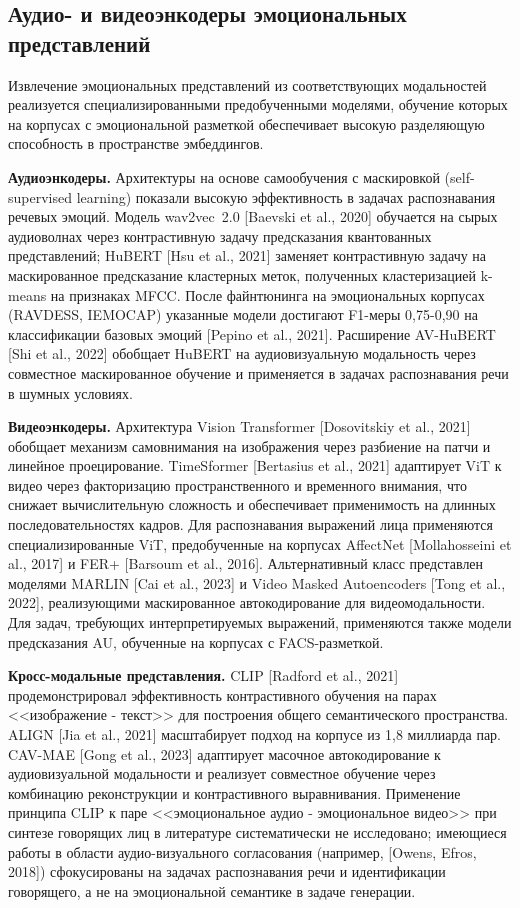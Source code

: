 \documentclass[a4paper, 12pt, oneside, openany]{article}
\begin{document}
\subsection{Аудио- и видеоэнкодеры эмоциональных представлений}

Извлечение эмоциональных представлений из соответствующих модальностей реализуется специализированными предобученными моделями, обучение которых на корпусах с эмоциональной разметкой обеспечивает высокую разделяющую способность в пространстве эмбеддингов.

\textbf{Аудиоэнкодеры.} Архитектуры на основе самообучения с маскировкой (self-supervised learning) показали высокую эффективность в задачах распознавания речевых эмоций. Модель wav2vec~2.0 [Baevski et al., 2020] обучается на сырых аудиоволнах через контрастивную задачу предсказания квантованных представлений; HuBERT [Hsu et al., 2021] заменяет контрастивную задачу на маскированное предсказание кластерных меток, полученных кластеризацией k-means на признаках MFCC. После файнтюнинга на эмоциональных корпусах (RAVDESS, IEMOCAP) указанные модели достигают F1-меры 0,75-0,90 на классификации базовых эмоций [Pepino et al., 2021]. Расширение AV-HuBERT [Shi et al., 2022] обобщает HuBERT на аудиовизуальную модальность через совместное маскированное обучение и применяется в задачах распознавания речи в шумных условиях.

\textbf{Видеоэнкодеры.} Архитектура Vision Transformer [Dosovitskiy et al., 2021] обобщает механизм самовнимания на изображения через разбиение на патчи и линейное проецирование. TimeSformer [Bertasius et al., 2021] адаптирует ViT к видео через факторизацию пространственного и временного внимания, что снижает вычислительную сложность и обеспечивает применимость на длинных последовательностях кадров. Для распознавания выражений лица применяются специализированные ViT, предобученные на корпусах AffectNet [Mollahosseini et al., 2017] и FER+ [Barsoum et al., 2016]. Альтернативный класс представлен моделями MARLIN [Cai et al., 2023] и Video Masked Autoencoders [Tong et al., 2022], реализующими маскированное автокодирование для видеомодальности. Для задач, требующих интерпретируемых выражений, применяются также модели предсказания AU, обученные на корпусах с FACS-разметкой.

\textbf{Кросс-модальные представления.} CLIP [Radford et al., 2021] продемонстрировал эффективность контрастивного обучения на парах <<изображение - текст>> для построения общего семантического пространства. ALIGN [Jia et al., 2021] масштабирует подход на корпусе из 1,8 миллиарда пар. CAV-MAE [Gong et al., 2023] адаптирует масочное автокодирование к аудиовизуальной модальности и реализует совместное обучение через комбинацию реконструкции и контрастивного выравнивания. Применение принципа CLIP к паре <<эмоциональное аудио - эмоциональное видео>> при синтезе говорящих лиц в литературе систематически не исследовано; имеющиеся работы в области аудио-визуального согласования (например, [Owens, Efros, 2018]) сфокусированы на задачах распознавания речи и идентификации говорящего, а не на эмоциональной семантике в задаче генерации.
\end{document}
